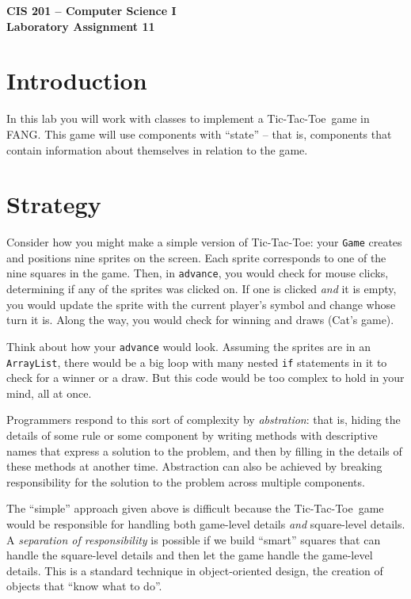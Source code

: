 \documentclass[12pt]{article}
\newcommand{\code}{\texttt}
\newcommand{\ttt}{Tic-Tac-Toe}
\begin{document}
\sloppypar

\begin{center}
\Large\bf
CIS 201 -- Computer Science I\\
Laboratory Assignment 11\\
\end{center}

\section*{Introduction}
In this lab you will work with classes
to implement a \ttt\ game in FANG.
This game will use components with ``state'' --
that is, components that contain information
about themselves in relation to the game.
\section*{Strategy}
Consider how you might make a simple version of \ttt:
your \code{Game} creates and positions nine sprites on the screen.
Each sprite corresponds to one of the nine squares in the game.
Then, in \code{advance}, you would check for mouse clicks,
determining if any of the sprites was clicked on.
If one is clicked \emph{and} it is empty,
you would update the sprite with the current player's symbol
and change whose turn it is.
Along the way, you would check for winning and draws (Cat's game).

Think about how your \code{advance} would look.
Assuming the sprites are in an \code{ArrayList},
there would be a big loop with many nested
\code{if} statements in it to check for a winner or a draw.
But this code would be too complex to hold in your mind, all at once.

Programmers respond to this sort of complexity by {\em abstration}:
that is, hiding the details of some rule or some component
by writing methods with descriptive names
that express a solution to the problem,
and then by filling in the details of these methods at another time.
Abstraction can also be achieved
by breaking responsibility for the solution to the problem
across multiple components.

The ``simple'' approach given above is difficult
because the \ttt\ game would be responsible
for handling both game-level details
\emph{and} square-level details.
A {\em separation of responsibility} is possible
if we build ``smart'' squares that can handle the square-level details
and then let the game handle the game-level details.
This is a standard technique in object-oriented design,
the creation of objects that ``know what to do''.
\vspace*{-1ex}
\end{document}
